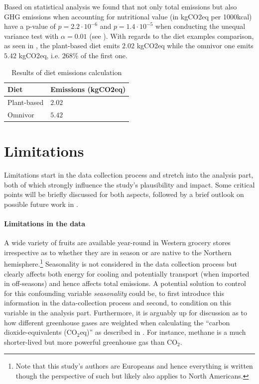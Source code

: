 \documentclass{article}
\begin{document}
Based on statistical analysis we found that not only total emissions but also GHG emissions when accounting for nutritional value (in kgCO2eq per 1000kcal) have a p-value of  $p= 2.2\cdot10^{-6} $  and $p= 1.4\cdot10^{-5}$  when conducting the unequal variance test with $\alpha = 0.01$ (see ). With regards to the diet examples comparison, as seen in , the plant-based diet emits $2.02$ kgCO2eq while the omnivor one emits $5.42$ kgCO2eq, i.e. $268\%$ of the first one.

\begin{table}
  \caption{Results of diet emissions calculation}
  \label{tbl:results-diets}
  \centering
  \begin{tabular}{ll}
    \toprule
    Diet    & Emissions (kgCO2eq)  \\
    \midrule
    Plant-based & $2.02$\\
    Omnivor    &  $5.42$\\
    \bottomrule
  \end{tabular}
\end{table}




\section{Limitations}
\label{limitations}
Limitations start in the data collection process and stretch into the analysis part, both of which strongly influence the study's plausibility and impact. Some critical points will be briefly discussed for both aspects, followed by  a brief outlook on possible future work in .

\paragraph*{Limitations in the data}
A wide variety of fruits  are  available year-round in Western grocery stores  irrespective as to whether  they are in season or are native to the Northern hemisphere.\footnote{Note that this study's authors are  Europeans and hence everything is written though the perspective of such but likely also applies to North Americans.} 
Seasonality is not considered in the data collection process but clearly affects both energy for cooling and  potentially transport (when imported in off-seasons) and hence affects total emissions.  
A potential solution to control for this confounding variable \textit{seasonality} could be, to first introduce this information in the data-collection process and second, to condition on this variable in the analysis part.
Furthermore, it is arguably up for discussion as to how different greenhouse gases are weighted  when calculating the ``carbon dioxide-equivalents (CO$_{2}$eq)'' as described in  . For instance, methane is a much shorter-lived but more powerful greenhouse gas than CO$_{2}$.
\end{document}
